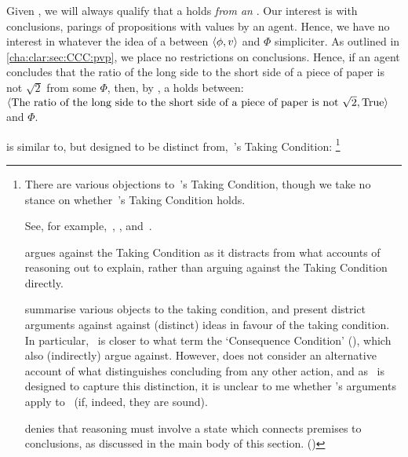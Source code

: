 \begin{note}
  Given \supportI{}, we will always qualify that a \ros{} holds \emph{from an \agpe{}}.
  Our interest is with conclusions, parings of propositions with values by an agent.
  Hence, we have no interest in whatever the idea of a \ros{} between \(\langle \phi, v \rangle\) and \(\Phi\) simpliciter.
  As outlined in \autoref{cha:clar:sec:CCC:pvp}, we place no restrictions on conclusions.
  Hence, if an agent concludes that the ratio of the long side to the short side of a piece of paper is not \(\sqrt{2}\) from some \poP{} \(\Phi\), then, by \supportI{}, a \ros{} holds between:
  \(\langle \text{The ratio of the long side to the short side of a piece of paper is not }\sqrt{2}, \text{True} \rangle\) and \(\Phi\).
\end{note}

\begin{note}
 \supportI{} is similar to, but designed to be distinct from,~\citeauthor{Boghossian:2014aa}'s Taking Condition:%
  \footnote{
    There are various objections to~\citeauthor{Boghossian:2014aa}'s Taking Condition, though we take no stance on whether~\citeauthor{Boghossian:2014aa}'s Taking Condition holds.

    See, for example,~\textcite{Hlobil:2014tq}, \textcite{McHugh:2016vp}, and~\textcite{Wright:2014tt}.

    \citeauthor{Hlobil:2014tq} argues against the Taking Condition as it distracts from what accounts of reasoning out to explain, rather than arguing against the Taking Condition directly.

    \citeauthor{McHugh:2016vp} summarise various objects to the taking condition, and present district arguments against against (distinct) ideas in favour of the taking condition.
    In particular,~\supportI{} is closer to what \citeauthor{McHugh:2016vp} term the `Consequence Condition' (\citeyear[cf.][316]{McHugh:2016vp}), which \citeauthor{McHugh:2016vp} also (indirectly) argue against.
    However, \citeauthor{McHugh:2016vp} does not consider an alternative account of what distinguishes concluding from any other action, and as~\supportI{} is designed to capture this distinction, it is unclear to me whether \citeauthor{McHugh:2016vp}'s arguments apply to~\supportI{} (if, indeed, they are sound).

    \citeauthor{Wright:2014tt} denies that reasoning must involve a state which connects premises to conclusions, as discussed in the main body of this section. (\citeyear[Cf.][33-34]{Wright:2014tt})
  }


\end{note}
